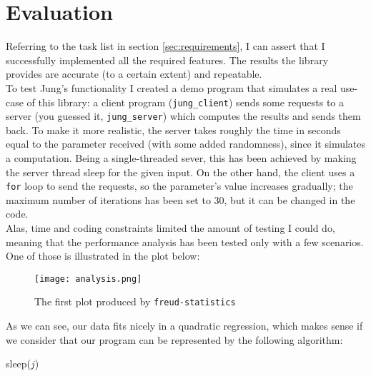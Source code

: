 \chapter{Evaluation}


    Referring to the task list in section \ref{sec:requirements}, I can assert that I successfully implemented
    all the required features. The results the library provides are accurate (to a certain extent) and repeatable.\\

    To test Jung's functionality I created a demo program that simulates a real use-case of this library:
    a client program (\texttt{jung\_client}) sends some requests to a server (you guessed it, 
    \texttt{jung\_server}) which computes the results and sends them back. To make it more realistic,
    the server takes roughly the time in seconds equal to the parameter received (with some added
    randomness), since it simulates a computation. Being a single-threaded sever, this has been
    achieved by making the server thread sleep for the given input. On the other hand, the client
    uses a \texttt{for} loop to send the requests, so the parameter's value increases gradually;
    the maximum number of iterations has been set to 30, but it can be changed in the code.\\

    Alas, time and coding constraints limited the amount of testing I could do,
    meaning that the performance analysis has been tested only with a few scenarios. One of those
    is illustrated in the plot below:\\

    \begin{figure}[H]
        \centering
        \texttt{[image: analysis.png]}
        \caption{The first plot produced by \texttt{freud-statistics}}
        \label{fig:analysis1}
    \end{figure}

    As we can see, our data fits nicely in a quadratic regression, which makes sense if we consider
    that our program can be represented by the following algorithm:\\

    \begin{algorithm}
         {
             {
                sleep($j$)\;
            }
        }
    \end{algorithm}

